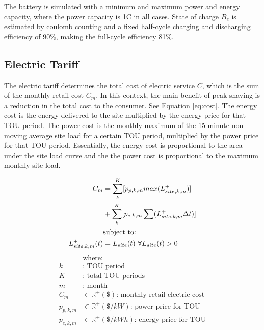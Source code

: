 \documentclass[conference]{IEEEtran}
\begin{document}
The battery is simulated with a minimum and maximum power and energy capacity, where the power capacity is 1C in all cases. State of charge $B_e$ is estimated by coulomb counting and a fixed half-cycle charging and discharging efficiency of 90\%, making the full-cycle efficiency 81\%. 

\subsection{Electric Tariff}

The electric tariff determines the total cost of electric service $C$, which is the sum of the monthly retail cost $C_m$. In this context, the main benefit of peak shaving is a reduction in the total cost to the consumer. See Equation \ref{eq:cost}. The energy cost is the energy delivered to the site multiplied by the energy price for that TOU period. The power cost is the monthly maximum of the 15-minute non-moving average site load for a certain TOU period, multiplied by the power price for that TOU period. Essentially, the energy cost is proportional to the area under the site load curve and the the power cost is proportional to the maximum monthly site load. 

\begin{align}
    C_m           & = \sum_k^K [p_{p,k,m}  max(L^+_{site,k,m})] \label{eq:cost}\\
                  & + \sum_k^K [p_{e,k,m} \sum (L^+_{site,k,m}\Delta t) ] \notag \\
                  & \text{subject to:} \notag \\
                  L_{site,k,m}^+(t) & = L_{site}(t)\ \forall L_{site}(t)>0 
  \end{align}
\begin{align*}
                  & \text{where:} \\
                  k & \text{: TOU period} \\
                  K & \text{: total TOU periods} \\
                  m & \text{: month} \\
    C_m           & \in \mathbb{R}^+ (\$) \text{: monthly retail electric cost} \\
    p_{p,k,m}     & \in \mathbb{R}^+ (\$/kW) \text{: power price for TOU} \\
    p_{e,k,m}     & \in \mathbb{R}^+ (\$/kWh) \text{: energy price for TOU} \\
\end{align*}
\end{document}
